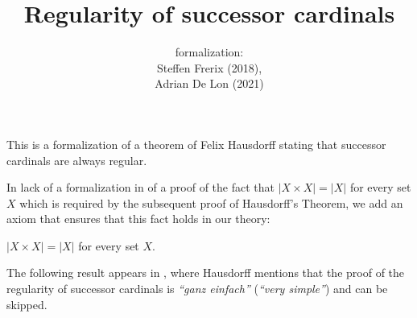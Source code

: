 \documentclass{article}
\title{Regularity of successor cardinals}
\author{\Naproche formalization:\\[0.5em]
Steffen Frerix (2018), \\
Adrian De Lon (2021)}
\date{}
\begin{document}
  \maketitle


  \noindent This is a formalization of a theorem of Felix Hausdorff stating that
  successor cardinals are always regular.

  In lack of a formalization in \Naproche of a proof of the fact that
  $|X \times X| = |X|$ for every set $X$ which is required by the subsequent
  proof of Hausdorff's Theorem, we add an axiom that ensures that this fact
  holds in our theory:

  \begin{forthel}
    \begin{axiom*}
      $|X \times X| = |X|$ for every set $X$.
    \end{axiom*}
  \end{forthel}

  The following result appears in \cite[p.~443]{Hausdorff1908},
  where Hausdorff mentions that the proof of the regularity of successor
  cardinals is \textit{``ganz einfach''} (\textit{``very simple''})
  and can be skipped.
\end{document}
